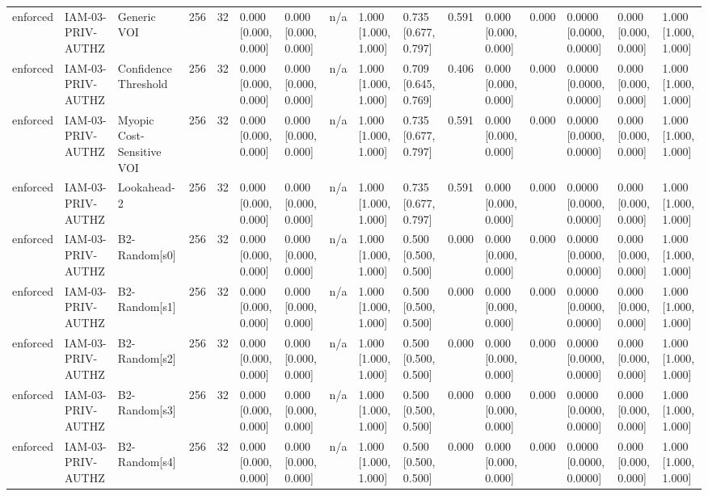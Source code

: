 \begin{table}[!ht]
{\begin{tabular}{llllllllllllllll}
enforced & IAM-03-PRIV-AUTHZ & Generic VOI & 256 & 32 & 0.000 [0.000, 0.000] & 0.000 [0.000, 0.000] & n/a & 1.000 [1.000, 1.000] & 0.735 [0.677, 0.797] & 0.591 & 0.000 [0.000, 0.000] & 0.000 & 0.0000 [0.0000, 0.0000] & 0.000 [0.000, 0.000] & 1.000 [1.000, 1.000] \\
enforced & IAM-03-PRIV-AUTHZ & Confidence Threshold & 256 & 32 & 0.000 [0.000, 0.000] & 0.000 [0.000, 0.000] & n/a & 1.000 [1.000, 1.000] & 0.709 [0.645, 0.769] & 0.406 & 0.000 [0.000, 0.000] & 0.000 & 0.0000 [0.0000, 0.0000] & 0.000 [0.000, 0.000] & 1.000 [1.000, 1.000] \\
enforced & IAM-03-PRIV-AUTHZ & Myopic Cost-Sensitive VOI & 256 & 32 & 0.000 [0.000, 0.000] & 0.000 [0.000, 0.000] & n/a & 1.000 [1.000, 1.000] & 0.735 [0.677, 0.797] & 0.591 & 0.000 [0.000, 0.000] & 0.000 & 0.0000 [0.0000, 0.0000] & 0.000 [0.000, 0.000] & 1.000 [1.000, 1.000] \\
enforced & IAM-03-PRIV-AUTHZ & Lookahead-2 & 256 & 32 & 0.000 [0.000, 0.000] & 0.000 [0.000, 0.000] & n/a & 1.000 [1.000, 1.000] & 0.735 [0.677, 0.797] & 0.591 & 0.000 [0.000, 0.000] & 0.000 & 0.0000 [0.0000, 0.0000] & 0.000 [0.000, 0.000] & 1.000 [1.000, 1.000] \\
enforced & IAM-03-PRIV-AUTHZ & B2-Random[s0] & 256 & 32 & 0.000 [0.000, 0.000] & 0.000 [0.000, 0.000] & n/a & 1.000 [1.000, 1.000] & 0.500 [0.500, 0.500] & 0.000 & 0.000 [0.000, 0.000] & 0.000 & 0.0000 [0.0000, 0.0000] & 0.000 [0.000, 0.000] & 1.000 [1.000, 1.000] \\
enforced & IAM-03-PRIV-AUTHZ & B2-Random[s1] & 256 & 32 & 0.000 [0.000, 0.000] & 0.000 [0.000, 0.000] & n/a & 1.000 [1.000, 1.000] & 0.500 [0.500, 0.500] & 0.000 & 0.000 [0.000, 0.000] & 0.000 & 0.0000 [0.0000, 0.0000] & 0.000 [0.000, 0.000] & 1.000 [1.000, 1.000] \\
enforced & IAM-03-PRIV-AUTHZ & B2-Random[s2] & 256 & 32 & 0.000 [0.000, 0.000] & 0.000 [0.000, 0.000] & n/a & 1.000 [1.000, 1.000] & 0.500 [0.500, 0.500] & 0.000 & 0.000 [0.000, 0.000] & 0.000 & 0.0000 [0.0000, 0.0000] & 0.000 [0.000, 0.000] & 1.000 [1.000, 1.000] \\
enforced & IAM-03-PRIV-AUTHZ & B2-Random[s3] & 256 & 32 & 0.000 [0.000, 0.000] & 0.000 [0.000, 0.000] & n/a & 1.000 [1.000, 1.000] & 0.500 [0.500, 0.500] & 0.000 & 0.000 [0.000, 0.000] & 0.000 & 0.0000 [0.0000, 0.0000] & 0.000 [0.000, 0.000] & 1.000 [1.000, 1.000] \\
enforced & IAM-03-PRIV-AUTHZ & B2-Random[s4] & 256 & 32 & 0.000 [0.000, 0.000] & 0.000 [0.000, 0.000] & n/a & 1.000 [1.000, 1.000] & 0.500 [0.500, 0.500] & 0.000 & 0.000 [0.000, 0.000] & 0.000 & 0.0000 [0.0000, 0.0000] & 0.000 [0.000, 0.000] & 1.000 [1.000, 1.000] \\

\end{tabular}}
\end{table}
